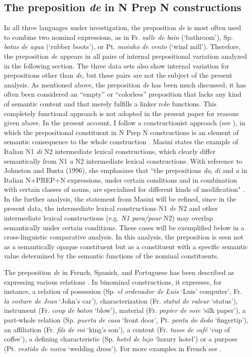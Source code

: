 \documentclass[output=paper]{langsci/langscibook}
\begin{document}
\subsection{The preposition \textit{de} in N Prep N constructions}
In all three languages under investigation, the preposition \textit{de} is most often used to combine two nominal expressions, as in Fr. \textit{salle de bain}  (`bathroom'), Sp. \textit{botas de agua} (`rubber boots'), or Pt. \textit{moinho de vento} (`wind mill'). Therefore, the preposition \textit{de} appears in all pairs of internal prepositional variation analyzed in the following section. The three data sets also show internal variation for prepositions other than \textit{de}, but these pairs are not the subject of the present analysis. As mentioned above, the preposition \textit{de} has been much discussed; it has often been considered an ``empty'' or ``colorless'' preposition that lacks any kind of semantic content and that merely fulfills a linker role functions. This completely functional approach is not adopted in the present paper for reasons given above.
In the present account, I follow a constructionist approach (see \citealt{Masini:2009}), in which the prepositional constituent in N Prep N constructions is an element of semantic consequence to the whole construction \citep[262]{Masini:2009}. Masini states the example of Italian N1 \textit{di} N2 intermediate lexical constructions, which clearly differ semantically from N1 \textit{a} N2 intermediate lexical constructions. With reference to Johnston and Busta (1996), she emphasizes that  ``the prepositions \textit{da}, \textit{di} and \textit{a} in Italian N+PREP+N expressions, under certain conditions and in combination with certain classes of nouns, are specialized for different kinds of modification" \citep[262]{Masini:2009}. In the further analysis, the statement from Masini will be refined, since in the present data, the intermediate lexical constructions N1 \textit{de} N2 and other intermediate lexical constructions (e.g. \textit{N1 para/pour} N2) may overlap semantically under certain conditions. These cases will be exemplified below in a cross-linguistic comparative analysis. In this analysis, the preposition is seen not as a semantically opaque constituent but as a constituent with a specific semantic value determined by the semantic functions of the nominal constituents.

The preposition \textit{de} in French, Spanish, and Portuguese has been described as expressing various relations \citep[187]{Bartning:1993}. In binominal constructions, it expresses, for instance, a relation of possession (Sp. \textit{el ordenador de Luis} `Luis' computer', Fr. \textit{la voiture de Jean} `John’s car'), characterization (Fr. \textit{statut de valeur} `status'), instrument (Fr. \textit{coup de baton} `blow'), material (Fr. \textit{papier de soie} `silk paper'), a part-whole relation (Sp. \textit{puerta de casa} `front door', Pt. \textit{ponta do dedo} `fingertip'), an affiliation (Fr. \textit{fils de roi} `king’s son'), a content (Fr. \textit{tasse de café} `cup of coffee'), a defining characteristic (Sp. \textit{hotel de lujo} `luxury hotel') or a purpose (Pt. \textit{vestido de noiva} `wedding dress'). For more examples in French see \citet[291ff.]{Lang:1991}.
\end{document}
